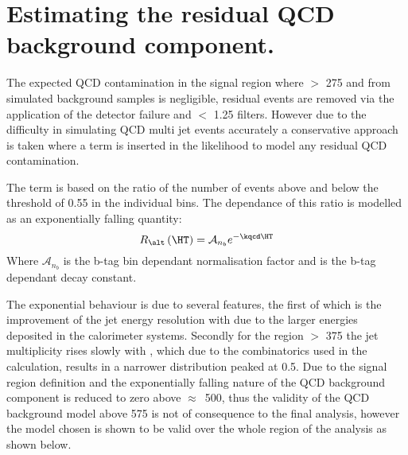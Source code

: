 
\section{Estimating the residual QCD background 
component.\cite{CMS-AN-11-517}} %
\label{sec:estimating_the_residual_qcd_background_component_}
The expected QCD contamination in the signal region where \HT $>$
\unit{275}{\GeV} and \altg from simulated background samples is 
negligible, residual events are removed via the application of the detector 
failure and \Rmiss $<$ 1.25 filters. However due to the difficulty in 
simulating QCD multi jet events accurately a conservative approach is taken 
where a term is inserted in the likelihood to model any residual QCD 
contamination.

The term is based on the ratio of the number of events above and below the \alt 
threshold of 0.55 in the individual \HT bins. The dependance of this ratio is 
modelled as an exponentially falling quantity:
\begin{equation}
  R_{\alt}\left(\HT\right)=\mathcal{A}_{n_{b}}e^{-\kqcd\HT}
\end{equation}
Where $\mathcal{A}_{n_{b}}$ is the b-tag bin dependant normalisation factor and 
\kqcd is the b-tag dependant decay constant.

The exponential behaviour is due to several features, the first of which is the 
improvement of the jet energy resolution with \HT due to the larger energies 
deposited in the calorimeter systems.  Secondly for the region \HT $>$ \unit{375}{\GeV} 
the jet multiplicity rises slowly with \HT, which due to the combinatorics  
used in the \alt calculation, results in a narrower \alt distribution peaked at 
0.5. Due to the signal region definition and the exponentially falling nature 
of the QCD background component is reduced to zero above 
$\approx$~\unit{500}{\GeV}, thus the validity of the QCD background model above 
\unit{575}{\GeV} is not of consequence to the final analysis, however the model 
chosen is shown to be valid over the whole \HT region of the analysis as shown 
below.

